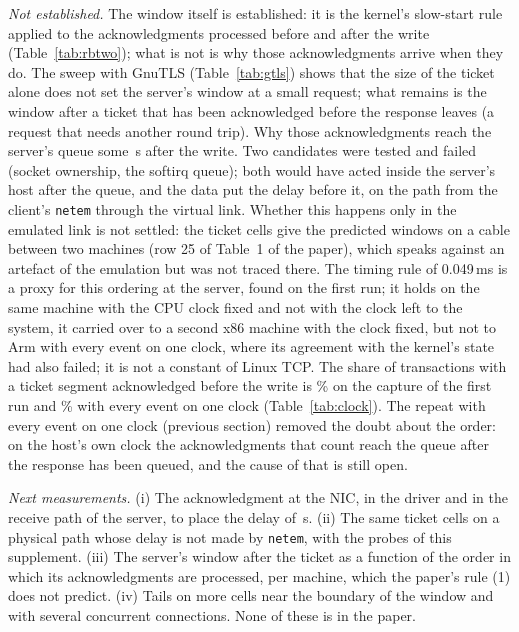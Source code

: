 \documentclass[9pt]{article}
\newcommand{\ms}{\,ms\xspace}
\begin{document}
\emph{Not established.} The window itself is established: it is the kernel's slow-start rule applied to the acknowledgments processed before and after the write (Table~\ref{tab:rbtwo}); what is not is why those acknowledgments arrive when they do. The sweep with GnuTLS (Table~\ref{tab:gtls}) shows that the size of the ticket alone does not set the server's window at a small request; what remains is the window after a ticket that has been acknowledged before the response leaves (a request that needs another round trip). Why those acknowledgments reach the server's queue some \HEnqMed\,\textmu s after the write. Two candidates were tested and failed (socket ownership, the softirq queue); both would have acted inside the server's host after the queue, and the data put the delay before it, on the path from the client's \texttt{netem} through the virtual link. Whether this happens only in the emulated link is not settled: the ticket cells give the predicted windows on a cable between two machines (row 25 of Table~1 of the paper), which speaks against an artefact of the emulation but was not traced there. The timing rule of 0.049\ms is a proxy for this ordering at the server, found on the first run; it holds on the same machine with the CPU clock fixed and not with the clock left to the system, it carried over to a second x86 machine with the clock fixed, but not to Arm with every event on one clock, where its agreement with the kernel's state had also failed; it is not a constant of Linux TCP. The share of transactions with a ticket segment acknowledged before the write is \RaceBeforePct\% on the capture of the first run and \RpKSixPct\% with every event on one clock (Table~\ref{tab:clock}). The repeat with every event on one clock (previous section) removed the doubt about the order: on the host's own clock the acknowledgments that count reach the queue after the response has been queued, and the cause of that is still open.

\emph{Next measurements.} (i) The acknowledgment at the NIC, in the driver and in the receive path of the server, to place the delay of \HEnqMed\,\textmu s. (ii) The same ticket cells on a physical path whose delay is not made by \texttt{netem}, with the probes of this supplement. (iii) The server's window after the ticket as a function of the order in which its acknowledgments are processed, per machine, which the paper's rule (1) does not predict. (iv) Tails on more cells near the boundary of the window and with several concurrent connections. None of these is in the paper.
\end{document}
